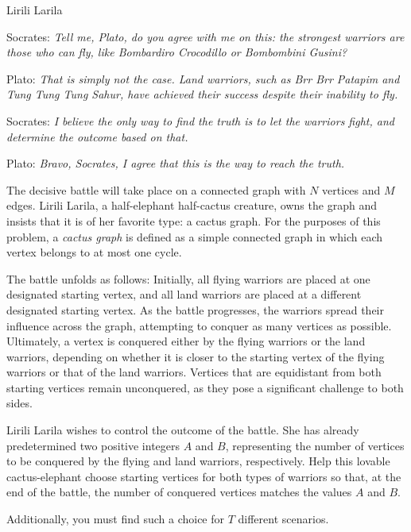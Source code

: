 \begin{statement}[
  problempoints=100,
  timelimit=2 seconds,
  memorylimit=512 MiB,
]{Lirili Larila}

Socrates:  
\textit{Tell me, Plato, do you agree with me on this:  
the strongest warriors are those who can fly, like Bombardiro Crocodillo or Bombombini Gusini?}

Plato:  
\textit{That is simply not the case. Land warriors, such as Brr Brr Patapim and Tung Tung Tung Sahur, 
have achieved their success despite their inability to fly.}

Socrates:  
\textit{I believe the only way to find the truth is to let the warriors fight, and  
determine the outcome based on that.}

Plato:  
\textit{Bravo, Socrates, I agree that this is the way to reach the truth.}

The decisive battle will take place on a connected graph with $N$ vertices and $M$ edges.  
Lirili Larila, a half-elephant half-cactus creature, owns the graph and insists that it is of her favorite type: a cactus graph.  
For the purposes of this problem, a \textit{cactus graph} is defined as a simple connected graph 
in which each vertex belongs to at most one cycle.

The battle unfolds as follows:  
Initially, all flying warriors are placed at one designated starting vertex, 
and all land warriors are placed at a different designated starting vertex.  
As the battle progresses, the warriors spread their influence across the graph, attempting to conquer as many vertices as possible.  
Ultimately, a vertex is conquered either by the flying warriors or the land warriors, depending on  
whether it is closer to the starting vertex of the flying warriors or that of the land warriors.  
Vertices that are equidistant from both starting vertices  
remain unconquered, as they pose a significant challenge to both sides.

Lirili Larila wishes to control the outcome of the battle.  
She has already predetermined two positive integers $A$ and $B$, 
representing the number of vertices to be conquered by the flying and land warriors, respectively.  
Help this lovable cactus-elephant choose starting vertices for both types of warriors 
so that, at the end of the battle, the number of conquered vertices matches the values $A$ and $B$.

Additionally, you must find such a choice for $T$ different scenarios.


\end{statement}
